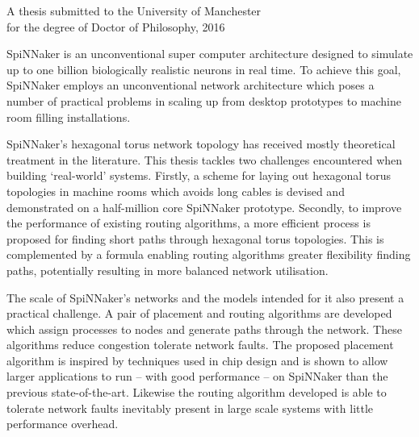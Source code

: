 {
	
	
	
	\vfill
	
	\begin{center}
		\textsc{\large\thesistitle}
		
		\vspace{0.5em}
		
		\thesisauthor
		
		\vspace{0.5em}
		
		A thesis submitted to the University of Manchester\\
		for the degree of Doctor of Philosophy, 2016
	\end{center}
	
	\vfill
	
	
	SpiNNaker is an unconventional super computer architecture designed to
	simulate up to one billion biologically realistic neurons in real time. To
	achieve this goal, SpiNNaker employs an unconventional network architecture
	which poses a number of practical problems in scaling up from desktop
	prototypes to machine room filling installations.
	
	SpiNNaker's hexagonal torus network topology has received mostly theoretical
	treatment in the literature. This thesis tackles two challenges encountered
	when building `real-world' systems.  Firstly, a scheme for laying out
	hexagonal torus topologies in machine rooms which avoids long cables is
	devised and demonstrated on a half-million core SpiNNaker prototype.
	Secondly, to improve the performance of existing routing algorithms, a more
	efficient process is proposed for finding short paths through hexagonal torus
	topologies. This is complemented by a formula enabling routing algorithms
	greater flexibility finding paths, potentially resulting in more balanced
	network utilisation.
	
	The scale of SpiNNaker's networks and the models intended for it also present
	a practical challenge. A pair of placement and routing algorithms are
	developed which assign processes to nodes and generate paths through the
	network. These algorithms reduce congestion tolerate network faults. The
	proposed placement algorithm is inspired by techniques used in chip design
	and is shown to allow larger applications to run -- with good performance --
	on SpiNNaker than the previous state-of-the-art. Likewise the routing
	algorithm developed is able to tolerate network faults inevitably present in
	large scale systems with little performance overhead.
	
	
	\par%
}
